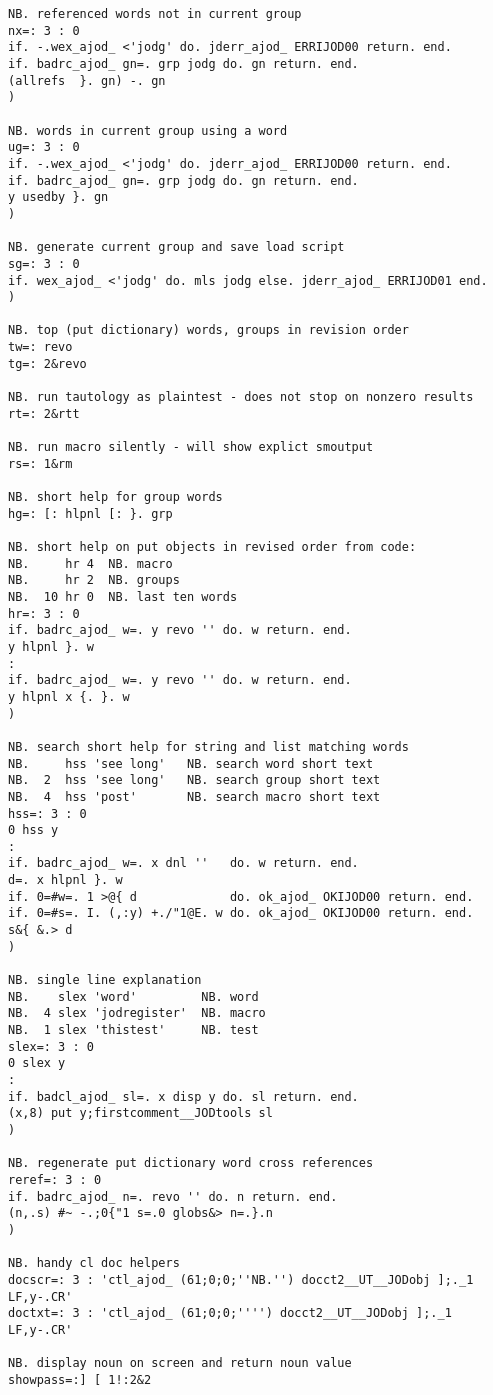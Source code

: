 \begin{lstlisting}[frame=single,framerule=0pt,basicstyle=\ttfamily\footnotesize]
NB. referenced words not in current group
nx=: 3 : 0
if. -.wex_ajod_ <'jodg' do. jderr_ajod_ ERRIJOD00 return. end.
if. badrc_ajod_ gn=. grp jodg do. gn return. end.
(allrefs  }. gn) -. gn
)
   
NB. words in current group using a word
ug=: 3 : 0
if. -.wex_ajod_ <'jodg' do. jderr_ajod_ ERRIJOD00 return. end.
if. badrc_ajod_ gn=. grp jodg do. gn return. end.
y usedby }. gn
)
   
NB. generate current group and save load script
sg=: 3 : 0
if. wex_ajod_ <'jodg' do. mls jodg else. jderr_ajod_ ERRIJOD01 end. 
)

NB. top (put dictionary) words, groups in revision order
tw=: revo
tg=: 2&revo

NB. run tautology as plaintest - does not stop on nonzero results
rt=: 2&rtt

NB. run macro silently - will show explict smoutput
rs=: 1&rm

NB. short help for group words
hg=: [: hlpnl [: }. grp

NB. short help on put objects in revised order from code:
NB.     hr 4  NB. macro
NB.     hr 2  NB. groups
NB.  10 hr 0  NB. last ten words
hr=: 3 : 0
if. badrc_ajod_ w=. y revo '' do. w return. end.
y hlpnl }. w
:
if. badrc_ajod_ w=. y revo '' do. w return. end.
y hlpnl x {. }. w
)

NB. search short help for string and list matching words
NB.     hss 'see long'   NB. search word short text 
NB.  2  hss 'see long'   NB. search group short text
NB.  4  hss 'post'       NB. search macro short text 
hss=: 3 : 0
0 hss y
:
if. badrc_ajod_ w=. x dnl ''   do. w return. end.
d=. x hlpnl }. w
if. 0=#w=. 1 >@{ d             do. ok_ajod_ OKIJOD00 return. end.
if. 0=#s=. I. (,:y) +./"1@E. w do. ok_ajod_ OKIJOD00 return. end.
s&{ &.> d
)

NB. single line explanation 
NB.    slex 'word'         NB. word
NB.  4 slex 'jodregister'  NB. macro
NB.  1 slex 'thistest'     NB. test
slex=: 3 : 0
0 slex y
:
if. badcl_ajod_ sl=. x disp y do. sl return. end.
(x,8) put y;firstcomment__JODtools sl
)

NB. regenerate put dictionary word cross references
reref=: 3 : 0
if. badrc_ajod_ n=. revo '' do. n return. end.
(n,.s) #~ -.;0{"1 s=.0 globs&> n=.}.n
)

NB. handy cl doc helpers
docscr=: 3 : 'ctl_ajod_ (61;0;0;''NB.'') docct2__UT__JODobj ];._1 LF,y-.CR'
doctxt=: 3 : 'ctl_ajod_ (61;0;0;'''') docct2__UT__JODobj ];._1 LF,y-.CR'

NB. display noun on screen and return noun value
showpass=:] [ 1!:2&2


\end{lstlisting}
